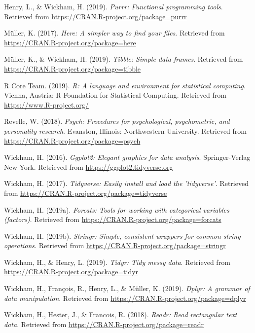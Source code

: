 \documentclass[man]{apa6}
\begin{document}
\hypertarget{ref-R-purrr}{}
Henry, L., \& Wickham, H. (2019). \emph{Purrr: Functional programming
tools}. Retrieved from \url{https://CRAN.R-project.org/package=purrr}

\hypertarget{ref-R-here}{}
Müller, K. (2017). \emph{Here: A simpler way to find your files}.
Retrieved from \url{https://CRAN.R-project.org/package=here}

\hypertarget{ref-R-tibble}{}
Müller, K., \& Wickham, H. (2019). \emph{Tibble: Simple data frames}.
Retrieved from \url{https://CRAN.R-project.org/package=tibble}

\hypertarget{ref-R-base}{}
R Core Team. (2019). \emph{R: A language and environment for statistical
computing}. Vienna, Austria: R Foundation for Statistical Computing.
Retrieved from \url{https://www.R-project.org/}

\hypertarget{ref-R-psych}{}
Revelle, W. (2018). \emph{Psych: Procedures for psychological,
psychometric, and personality research}. Evanston, Illinois:
Northwestern University. Retrieved from
\url{https://CRAN.R-project.org/package=psych}

\hypertarget{ref-R-ggplot2}{}
Wickham, H. (2016). \emph{Ggplot2: Elegant graphics for data analysis}.
Springer-Verlag New York. Retrieved from
\url{https://ggplot2.tidyverse.org}

\hypertarget{ref-R-tidyverse}{}
Wickham, H. (2017). \emph{Tidyverse: Easily install and load the
'tidyverse'}. Retrieved from
\url{https://CRAN.R-project.org/package=tidyverse}

\hypertarget{ref-R-forcats}{}
Wickham, H. (2019a). \emph{Forcats: Tools for working with categorical
variables (factors)}. Retrieved from
\url{https://CRAN.R-project.org/package=forcats}

\hypertarget{ref-R-stringr}{}
Wickham, H. (2019b). \emph{Stringr: Simple, consistent wrappers for
common string operations}. Retrieved from
\url{https://CRAN.R-project.org/package=stringr}

\hypertarget{ref-R-tidyr}{}
Wickham, H., \& Henry, L. (2019). \emph{Tidyr: Tidy messy data}.
Retrieved from \url{https://CRAN.R-project.org/package=tidyr}

\hypertarget{ref-R-dplyr}{}
Wickham, H., François, R., Henry, L., \& Müller, K. (2019). \emph{Dplyr:
A grammar of data manipulation}. Retrieved from
\url{https://CRAN.R-project.org/package=dplyr}

\hypertarget{ref-R-readr}{}
Wickham, H., Hester, J., \& Francois, R. (2018). \emph{Readr: Read
rectangular text data}. Retrieved from
\url{https://CRAN.R-project.org/package=readr}
\end{document}
